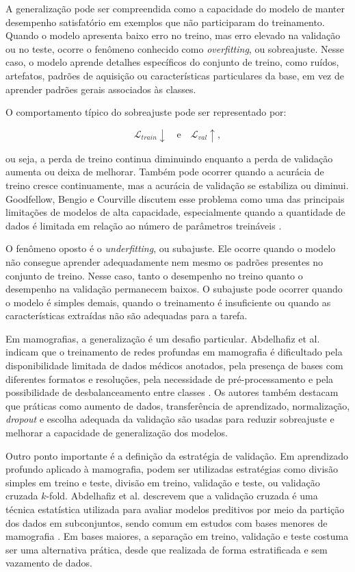 \documentclass[
    12pt,
    openright,
    oneside,
    a4paper,
    english,
    brazil
]{abntex2}
\begin{document}
A generalização pode ser compreendida como a capacidade do modelo de manter desempenho satisfatório em exemplos que não participaram do treinamento. Quando o modelo apresenta baixo erro no treino, mas erro elevado na validação ou no teste, ocorre o fenômeno conhecido como \textit{overfitting}, ou sobreajuste. Nesse caso, o modelo aprende detalhes específicos do conjunto de treino, como ruídos, artefatos, padrões de aquisição ou características particulares da base, em vez de aprender padrões gerais associados às classes.

O comportamento típico do sobreajuste pode ser representado por:

\[
\mathcal{L}_{train} \downarrow
\quad \text{e} \quad
\mathcal{L}_{val} \uparrow,
\]

ou seja, a perda de treino continua diminuindo enquanto a perda de validação aumenta ou deixa de melhorar. Também pode ocorrer quando a acurácia de treino cresce continuamente, mas a acurácia de validação se estabiliza ou diminui. Goodfellow, Bengio e Courville discutem esse problema como uma das principais limitações de modelos de alta capacidade, especialmente quando a quantidade de dados é limitada em relação ao número de parâmetros treináveis \cite{goodfellow2016deep}.

O fenômeno oposto é o \textit{underfitting}, ou subajuste. Ele ocorre quando o modelo não consegue aprender adequadamente nem mesmo os padrões presentes no conjunto de treino. Nesse caso, tanto o desempenho no treino quanto o desempenho na validação permanecem baixos. O subajuste pode ocorrer quando o modelo é simples demais, quando o treinamento é insuficiente ou quando as características extraídas não são adequadas para a tarefa.

Em mamografias, a generalização é um desafio particular. Abdelhafiz et al. indicam que o treinamento de redes profundas em mamografia é dificultado pela disponibilidade limitada de dados médicos anotados, pela presença de bases com diferentes formatos e resoluções, pela necessidade de pré-processamento e pela possibilidade de desbalanceamento entre classes \cite{abdelhafiz2019}. Os autores também destacam que práticas como aumento de dados, transferência de aprendizado, normalização, \textit{dropout} e escolha adequada da validação são usadas para reduzir sobreajuste e melhorar a capacidade de generalização dos modelos.

Outro ponto importante é a definição da estratégia de validação. Em aprendizado profundo aplicado à mamografia, podem ser utilizadas estratégias como divisão simples em treino e teste, divisão em treino, validação e teste, ou validação cruzada \(k\)-fold. Abdelhafiz et al. descrevem que a validação cruzada é uma técnica estatística utilizada para avaliar modelos preditivos por meio da partição dos dados em subconjuntos, sendo comum em estudos com bases menores de mamografia \cite{abdelhafiz2019}. Em bases maiores, a separação em treino, validação e teste costuma ser uma alternativa prática, desde que realizada de forma estratificada e sem vazamento de dados.
\end{document}
